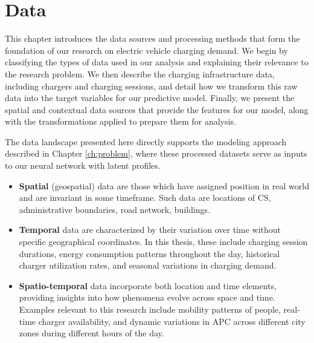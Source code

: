\setchapterpreamble[u]{\margintoc}
\chapter{Data}
\label{ch:data}


This chapter introduces the data sources and processing methods that form the foundation of our research on electric vehicle charging demand. We begin by classifying the types of data used in our analysis and explaining their relevance to the research problem. We then describe the charging infrastructure data, including chargers and charging sessions, and detail how we transform this raw data into the target variables for our predictive model. Finally, we present the spatial and contextual data sources that provide the features for our model, along with the transformations applied to prepare them for analysis.

The data landscape presented here directly supports the modeling approach described in Chapter \ref{ch:problem}, where these processed datasets serve as inputs to our neural network with latent profiles.

\begin{kaobox}[frametitle=Types of data]

    \begin{itemize}
        \item \textbf{Spatial} (geospatial) data are those which have assigned position in real world and are invariant in some timeframe. Such data are locations of \acrlong{CS}, administrative boundaries, road network, buildings.
        \item \textbf{Temporal} data are characterized by their variation over time without specific geographical coordinates. In this thesis, these include charging session durations, energy consumption patterns throughout the day, historical charger utilization rates, and seasonal variations in charging demand.
        \item \textbf{Spatio-temporal} data incorporate both location and time elements, providing insights into how phenomena evolve across space and time. Examples relevant to this research include mobility patterns of people, real-time charger availability, and dynamic variations in \acrshort{APC} across different city zones during different hours of the day.
    \end{itemize}
\end{kaobox}

